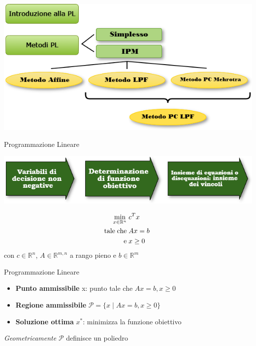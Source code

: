 
\begin{frame}[t,plain]
\titlepage
\end{frame}


\begin{frame}
\includegraphics[width = 11 cm]{intro.png}
\end{frame}


\begin{frame}{\textrm {Programmazione Lineare}}
	\begin{center}
	\includegraphics[width = 7 cm]{fasi.png}
	\end{center}
\pause
\begin{equation*}
\begin{split}
\min\limits_{x\in\mathbb{R}^{n}}\;&c^{T}x\\
\text{tale\;che\;}&Ax= b\;\\\text{e\;}&x\geq0
\end{split}
\end{equation*}
con $c\in\mathbb{R}^{n}$, $A\in\mathbb{R}^{m,n}$ a rango pieno e $b\in\mathbb{R}^{m}$	
\end{frame}


\begin{frame}{\textrm{Programmazione Lineare}}
	\pause
	\begin{itemize}
		\item \textbf{Punto ammissibile} x: punto tale che $Ax = b, x\geq 0$
		\pause
		\item \textbf{Regione ammissibile} $\mathcal{P}=\{x\;|\; Ax = b, x\geq 0\}$
		\pause
		\item \textbf{Soluzione ottima} $x^{*}$: minimizza la funzione obiettivo
		\pause
	\end{itemize}
\pause
\emph{Geometricamente} $\mathcal{P}$ definisce un poliedro
\end{frame}

